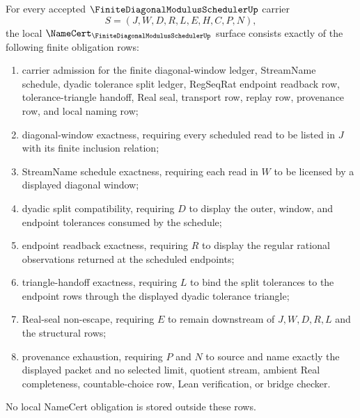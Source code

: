 \begin{theorem}\label{thm:finite-diagonal-modulus-scheduler-namecert-obligations}
For every accepted $\FiniteDiagonalModulusSchedulerUp$ carrier
$$
S=(J,W,D,R,L,E,H,C,P,N),
$$
the local $\NameCert_{\FiniteDiagonalModulusSchedulerUp}$ surface consists exactly of the following finite obligation rows:
\begin{enumerate}
\item carrier admission for the finite diagonal-window ledger, StreamName schedule, dyadic tolerance split ledger, RegSeqRat endpoint readback row, tolerance-triangle handoff, Real seal, transport row, replay row, provenance row, and local naming row;
\item diagonal-window exactness, requiring every scheduled read to be listed in $J$ with its finite inclusion relation;
\item StreamName schedule exactness, requiring each read in $W$ to be licensed by a displayed diagonal window;
\item dyadic split compatibility, requiring $D$ to display the outer, window, and endpoint tolerances consumed by the schedule;
\item endpoint readback exactness, requiring $R$ to display the regular rational observations returned at the scheduled endpoints;
\item triangle-handoff exactness, requiring $L$ to bind the split tolerances to the endpoint rows through the displayed dyadic tolerance triangle;
\item Real-seal non-escape, requiring $E$ to remain downstream of $J,W,D,R,L$ and the structural rows;
\item provenance exhaustion, requiring $P$ and $N$ to source and name exactly the displayed packet and no selected limit, quotient stream, ambient Real completeness, countable-choice row, Lean verification, or bridge checker.
\end{enumerate}
No local NameCert obligation is stored outside these rows.
\end{theorem}
